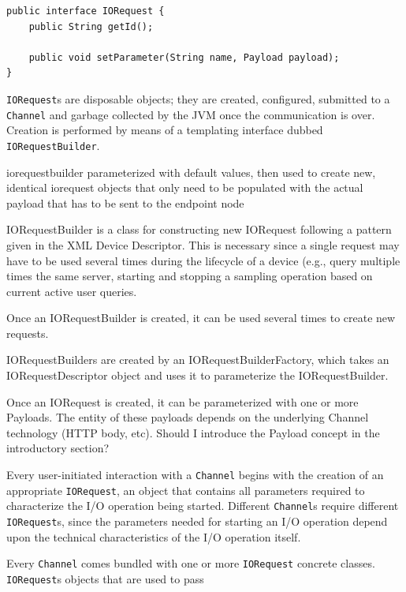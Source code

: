 \lstset{language=Java}
\begin{lstlisting}[float,floatplacement=H,caption=The IORequest interface,label={lst:iorequest}]
public interface IORequest {
	public String getId();

	public void setParameter(String name, Payload payload);
}
\end{lstlisting}

\texttt{IORequest}s are disposable objects; they are created, configured, submitted to a \texttt{Channel} and garbage collected by the JVM once the communication is over. Creation is performed by means of a templating interface dubbed \texttt{IORequestBuilder}. 

iorequestbuilder parameterized with default values, then used to create new, identical iorequest objects that only need to be populated with the actual payload that has to be sent to the endpoint node


IORequestBuilder is a class for constructing new IORequest following a pattern given in the XML Device Descriptor. This is necessary since a single request may have to be used several times during the lifecycle of a device (e.g., query multiple times the same server, starting and stopping a sampling operation based on current active user queries.

Once an IORequestBuilder is created, it can be used several times to create new requests.

IORequestBuilders are created by an IORequestBuilderFactory, which takes an IORequestDescriptor object and uses it to parameterize the IORequestBuilder.


Once an IORequest is created, it can be parameterized with one or more Payloads. The entity of these payloads depends on the underlying Channel technology (HTTP body, etc). Should I introduce the Payload concept in the introductory section?






Every user-initiated interaction with a \texttt{Channel} begins with the creation of an appropriate \texttt{IORequest}, an object that contains all parameters required to characterize the I/O operation being started. Different \texttt{Channel}s require different \texttt{IORequest}s, since the parameters needed for starting an I/O operation depend upon the technical characteristics of the I/O operation itself.


Every \texttt{Channel} comes bundled with one or more \texttt{IORequest} concrete classes. \texttt{IORequest}s objects that are used to pass






